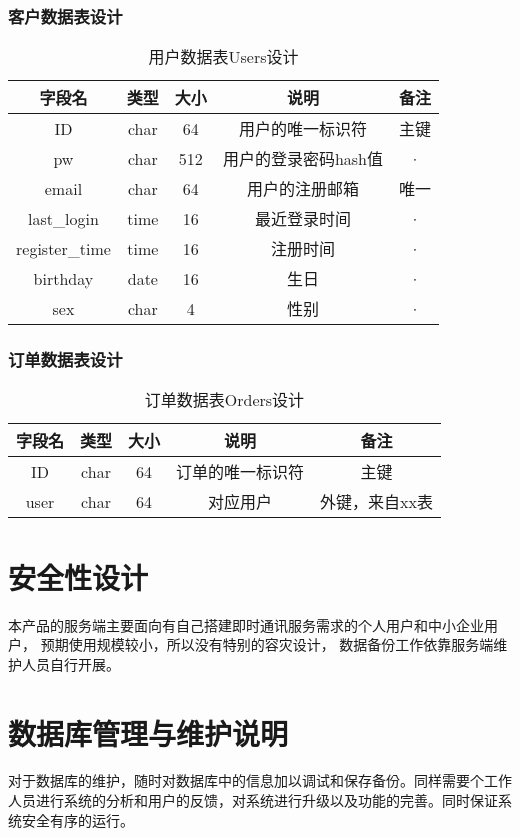 \subsubsection{客户数据表设计}
\begin{table}[htbp]
\centering
\caption{用户数据表Users设计} \label{tab:client-database}
\begin{tabular}{|c|c|c|c|c|}
    \hline
    字段名 & 类型 & 大小 & 说明 & 备注 \\
    \hline
    ID & char & 64 & 用户的唯一标识符 & 主键 \\
    \hline
    pw & char & 512 & 用户的登录密码hash值 & · \\
    \hline
    email & char & 64 & 用户的注册邮箱 & 唯一 \\
    \hline
    last\_login & time & 16 & 最近登录时间 & · \\
    \hline
    register\_time & time & 16 & 注册时间 & · \\
    \hline
    birthday & date & 16 & 生日 & · \\
    \hline
    sex & char & 4 & 性别 & · \\
    \hline
\end{tabular}
\end{table}

\subsubsection{订单数据表设计}
\begin{table}[htbp]
\centering
\caption{订单数据表Orders设计} \label{tab:order-database}
\begin{tabular}{|c|c|c|c|c|}
    \hline
    字段名 & 类型 & 大小 & 说明 & 备注 \\
    \hline
    ID & char & 64 & 订单的唯一标识符 & 主键\\
    \hline
    user & char & 64 & 对应用户 & 外键，来自xx表 \\
    \hline
\end{tabular}
\end{table}
\section{安全性设计}
本产品的服务端主要面向有自己搭建即时通讯服务需求的个人用户和中小企业用户，
预期使用规模较小，所以没有特别的容灾设计，
数据备份工作依靠服务端维护人员自行开展。

\section{数据库管理与维护说明}
对于数据库的维护，随时对数据库中的信息加以调试和保存备份。同样需要个工作人员进行系统的分析和用户的反馈，对系统进行升级以及功能的完善。同时保证系统安全有序的运行。